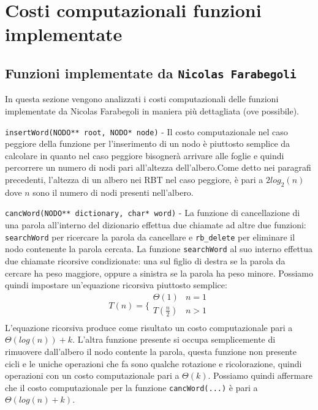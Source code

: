 \documentclass[paper=a4, fontsize=11pt,twoside]{scrartcl}   %
\begin{document}
		\section{Costi computazionali funzioni implementate}
			\subsection{Funzioni implementate da \texttt{Nicolas Farabegoli}}
				In questa sezione vengono analizzati i costi computazionali delle funzioni implementate da Nicolas Farabegoli in maniera più dettagliata (ove possibile).
								
				\texttt{insertWord(NODO** root, NODO* node)} - Il costo computazionale nel caso peggiore della funzione per l'inserimento di un nodo è piuttosto semplice da calcolare in quanto nel caso peggiore bisognerà arrivare alle foglie e quindi percorrere un numero di nodi pari all'altezza dell'albero.Come detto nei paragrafi precedenti, l'altezza di un albero nei RBT nel caso peggiore, è pari a $2log_2(n)$ dove $n$ sono il numero di nodi presenti nell'albero.\par
				
				\texttt{cancWord(NODO** dictionary, char* word)} - La funzione di cancellazione di una parola all'interno del dizionario effettua due chiamate ad altre due funzioni: \texttt{searchWord} per ricercare la parola da cancellare e \texttt{rb\_delete} per eliminare il nodo contenente la parola cercata. La funzione \texttt{searchWord} al suo interno effettua due chiamate ricorsive condizionate: una sul figlio di destra se la parola da cercare ha peso maggiore, oppure a sinistra se la parola ha peso minore. Possiamo quindi impostare un'equazione ricorsiva piuttosto semplice:				
				$$T(n) =
				\bigg \{
				\begin{array}{rl}
				\Theta(1) & n = 1 \\
				T(\frac{n}{2}) & n > 1 \\
				\end{array}
				$$
				L'equazione ricorsiva produce come risultato un costo computazionale pari a $\Theta(log(n)) + k$.
				L'altra funzione presente si occupa semplicemente di rimuovere dall'albero il nodo contente la parola, questa funzione non presente cicli e le uniche operazioni che fa sono qualche rotazione e ricolorazione, quindi operazioni con un costo computazionale pari a $\Theta(k)$.
				Possiamo quindi affermare che il costo computazionale per la funzione \texttt{cancWord(...)} è pari a $\Theta(log(n) + k)$.\par
				
\end{document}
